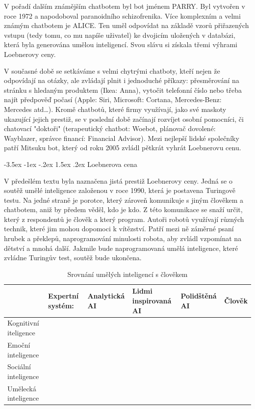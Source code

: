 \documentclass[a4paper,10pt]{article}
\makeatletter
\theoremstyle{definition}
\renewcommand\section{\@startsection {section}{1}{\z@}%
                                   {-3.5ex \@plus -1ex \@minus -.2ex}%
                                   {1.5ex \@plus.2ex}%
                                   {\large\bfseries}}
\newcommand{\fajfka}{\textcolor[RGB]{0,166,79}{\ding{51}}}
\newcommand{\krizek}{\textcolor[RGB]{237,27,35}{\ding{55}}}
\makeatother
\begin{document}
V pořadí dalším známějším chatbotem byl bot jménem PARRY. Byl vytvořen v roce 1972 a napodoboval paranoidního schizofrenika.
Více komplexním a velmi známým chatbotem je ALICE. Ten uměl odpovídat na základě vzorů přiřazených vstupu (tedy tomu, co mu napíše uživatel) ke dvojicím uložených v databázi, která byla generována umělou inteligencí. Svou slávu si získala třemi výhrami Loebnerovy ceny.

V současné době se setkáváme s velmi chytrými chatboty, kteří nejen že odpovídají na otázky, ale zvládají plnit i jednoduché příkazy: přesměrování na stránku s hledaným produktem (Ikea: Anna), vytočit telefonní číslo nebo třeba najít předpověď počasí (Apple: Siri, Microsoft: Cortana, Mercedes-Benz: Mercedes atd…). Kromě chatbotů, které firmy využívají, jako své maskoty ukazující jejich prestiž, se v poslední době začínají rozvíjet osobní pomocníci, či chatovací "doktoři" (terapeutický chatbot: Woebot, plánovač dovolené: Wayblazer, správce financí: Financial Advisor). Mezi nejlepší lidské společníky patří Mitsuku bot, který od roku 2005 zvládl pětkrát vyhrát Loebnerovu cenu. 



\section{Loebnerova cena}
\label{sec:2}

V předešlém textu byla naznačena jistá prestiž Loebnerovy ceny. Jedná se o soutěž umělé inteligence založenou v roce 1990, která je postavena Turingově testu. Na jedné straně je porotce, který zároveň komunikuje s jiným člověkem a chatbotem, aniž by předem věděl, kdo je kdo. Z této komunikace se snaží určit, který z respondentů je člověk a který program. Autoři robotů využívají různých technik, které jim mohou dopomoci k vítězství. Patří mezi ně záměrné psaní hrubek a překlepů, naprogramování minulosti robota, aby zvládl vzpomínat na dětství a mnohá další. Jakmile bude naprogramovaná umělá inteligence, které zvládne Turingův test, soutěž bude ukončena.

\begin{table}[h] 
\begin{center}
\label{tab:1}
\begin{tabular}{llllll}
\hline\noalign{\smallskip}
& Expertní systém: & Analytická AI & Lidmi inspirovaná AI & Polidštěná AI & Člověk\\
\hline Kognitivní iteligence & \krizek & \fajfka & \fajfka & \fajfka & \fajfka \\
Emoční inteligence & \krizek & \krizek & \fajfka & \fajfka & \fajfka \\
Sociální inteligence & \krizek & \krizek & \krizek & \fajfka & \fajfka \\
Umělecká inteligence & \krizek & \krizek & \krizek & \krizek & \fajfka \\
\hline
\end{tabular}
\caption{Srovnání umělých inteligencí s člověkem} 
\end{center}
\end{table}
\end{document}
